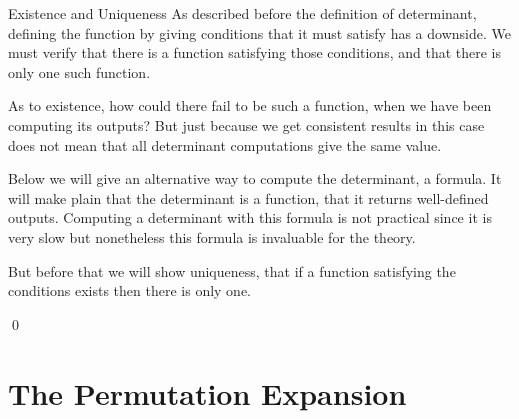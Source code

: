 \begin{frame}{Existence and Uniqueness}
As described before the definition of determinant,
defining the function by giving conditions that it must satisfy
has a downside.
We must verify that there is a 
function satisfying those conditions, and that there is only one such function.

As to existence,
how could there fail to be such a function, when we have been 
computing its outputs?
But just because we get consistent results in this case
does not mean that all determinant computations
give the same value.
\end{frame}
\begin{frame}
Below we will give an alternative way to compute
the determinant, a formula.
It will make plain that the determinant is a function, 
that it returns well-defined outputs.
Computing a determinant with this formula  
is not practical since it is very slow
but nonetheless this formula is invaluable for the theory.

\pause
But before that we will show uniqueness, 
that if a function satisfying the conditions
exists then there is only one.

\lm[lm:DetFcnIsUnique]

\pf 
{}
\qed
\end{frame}




\section{The Permutation Expansion}

